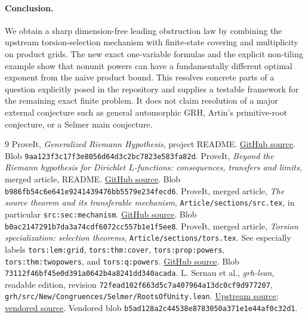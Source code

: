\documentclass[11pt]{article}
\theoremstyle{definition}
\begin{document}
\paragraph{Conclusion.} We obtain a sharp dimension-free leading obstruction law by combining the upstream torsion-selection mechanism with finite-state covering and multiplicity on product grids. The new exact one-variable formulas and the explicit non-tiling example show that nonunit powers can have a fundamentally different optimal exponent from the naive product bound. This resolves concrete parts of a question explicitly posed in the repository and supplies a testable framework for the remaining exact finite problem. It does not claim resolution of a major external conjecture such as general automorphic GRH, Artin's primitive-root conjecture, or a Selmer main conjecture.

\begingroup\small
\begin{thebibliography}{9}
\setlength{\itemsep}{1pt}
 ProveIt, \emph{Generalized Riemann Hypothesis}, project README. \href{https://github.com/VladimirReshetnikov/ProveIt/blob/main/Analysis/GeneralizedRiemannHypothesis/README.md}{GitHub source}. Blob \texttt{9aa123f3c17f3e8056d64d3c2bc7823e583fa82d}.
 ProveIt, \emph{Beyond the Riemann hypothesis for Dirichlet $L$-functions: consequences, transfers and limits}, merged article, README. \href{https://github.com/VladimirReshetnikov/ProveIt/blob/main/Analysis/GeneralizedRiemannHypothesis/Article/README.md}{GitHub source}. Blob \texttt{b986fb54c6e641e9241439476bb5579e234fecd6}.
 ProveIt, merged article, \emph{The source theorem and its transferable mechanism}, \texttt{Article/sections/src.tex}, in particular \texttt{src:sec:mechanism}. \href{https://github.com/VladimirReshetnikov/ProveIt/blob/main/Analysis/GeneralizedRiemannHypothesis/Article/sections/src.tex}{GitHub source}. Blob \texttt{b0ac2147291b7da3a74cdf6072cc557b1e1f5ee8}.
 ProveIt, merged article, \emph{Torsion specialization: selection theorems}, \texttt{Article/sections/tors.tex}. See especially labels \texttt{tors:lem:grid}, \texttt{tors:thm:cover}, \texttt{tors:prop:powers}, \texttt{tors:thm:twopowers}, and \texttt{tors:q:powers}. \href{https://github.com/VladimirReshetnikov/ProveIt/blob/main/Analysis/GeneralizedRiemannHypothesis/Article/sections/tors.tex}{GitHub source}. Blob \texttt{73112f46bf45e0d391a0642b4a8241dd340acada}.
 L. Sernau et al., \emph{grh-lean}, readable edition, revision \texttt{72fead102f663d5c7a407964a13dc0cf9d977207}, \nolinkurl{grh/src/New/Congruences/Selmer/RootsOfUnity.lean}. \href{https://github.com/lsernau/grh-lean/blob/72fead102f663d5c7a407964a13dc0cf9d977207/grh/src/New/Congruences/Selmer/RootsOfUnity.lean}{Upstream source}; \href{https://github.com/VladimirReshetnikov/ProveIt/blob/main/Analysis/GeneralizedRiemannHypothesis/vendor/grh-lean/grh/src/New/Congruences/Selmer/RootsOfUnity.lean}{vendored source}. Vendored blob \nolinkurl{b5ad128a2c44538e8783050a371e1e44af0c32d1}.
\end{thebibliography}
\endgroup
\end{document}
